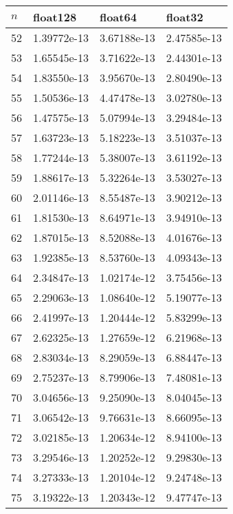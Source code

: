 \documentclass{article}
\begin{document}
\begin{table}[H]
{\begin{tabular}{|l|l|l|l|}
\end{tabular}
\hspace*{0cm}
}
\parbox{.45\linewidth}{
\hspace*{0cm}
\begin{tabular}{|l|l|l|l|}
\hline
$n$ & float128 & float64 & float32 \\ \hline
52 & 1.39772e-13 & 3.67188e-13 & 2.47585e-13 \\ \hline
53 & 1.65545e-13 & 3.71622e-13 & 2.44301e-13 \\ \hline
54 & 1.83550e-13 & 3.95670e-13 & 2.80490e-13 \\ \hline
55 & 1.50536e-13 & 4.47478e-13 & 3.02780e-13 \\ \hline
56 & 1.47575e-13 & 5.07994e-13 & 3.29484e-13 \\ \hline
57 & 1.63723e-13 & 5.18223e-13 & 3.51037e-13 \\ \hline
58 & 1.77244e-13 & 5.38007e-13 & 3.61192e-13 \\ \hline
59 & 1.88617e-13 & 5.32264e-13 & 3.53027e-13 \\ \hline
60 & 2.01146e-13 & 8.55487e-13 & 3.90212e-13 \\ \hline
61 & 1.81530e-13 & 8.64971e-13 & 3.94910e-13 \\ \hline
62 & 1.87015e-13 & 8.52088e-13 & 4.01676e-13 \\ \hline
63 & 1.92385e-13 & 8.53760e-13 & 4.09343e-13 \\ \hline
64 & 2.34847e-13 & 1.02174e-12 & 3.75456e-13 \\ \hline
65 & 2.29063e-13 & 1.08640e-12 & 5.19077e-13 \\ \hline
66 & 2.41997e-13 & 1.20444e-12 & 5.83299e-13 \\ \hline
67 & 2.62325e-13 & 1.27659e-12 & 6.21968e-13 \\ \hline
68 & 2.83034e-13 & 8.29059e-13 & 6.88447e-13 \\ \hline
69 & 2.75237e-13 & 8.79906e-13 & 7.48081e-13 \\ \hline
70 & 3.04656e-13 & 9.25090e-13 & 8.04045e-13 \\ \hline
71 & 3.06542e-13 & 9.76631e-13 & 8.66095e-13 \\ \hline
72 & 3.02185e-13 & 1.20634e-12 & 8.94100e-13 \\ \hline
73 & 3.29546e-13 & 1.20252e-12 & 9.29830e-13 \\ \hline
74 & 3.27333e-13 & 1.20104e-12 & 9.24748e-13 \\ \hline
75 & 3.19322e-13 & 1.20343e-12 & 9.47747e-13 \\ \hline

\end{tabular}}
\end{table}
\end{document}

